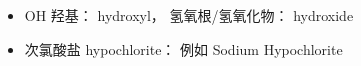 
\begin{itemize}
\item OH 羟基： hydroxyl，  氢氧根/氢氧化物： hydroxide
\item 次氯酸盐 hypochlorite： 例如 Sodium Hypochlorite
\end{itemize}
